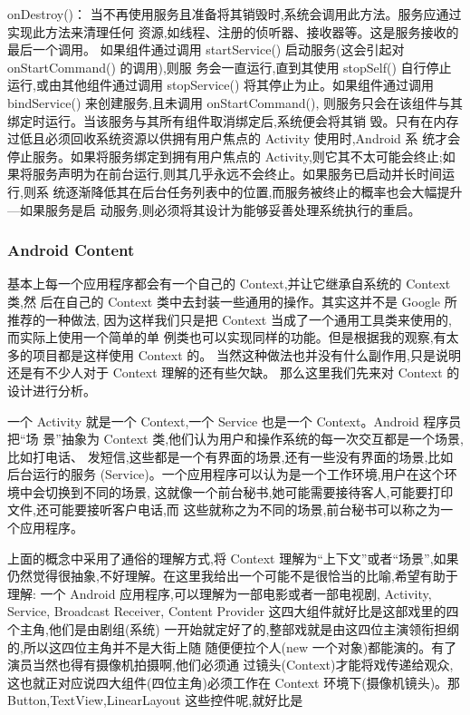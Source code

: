 \documentclass[UTF8]{ctexart}
\begin{document}
onDestroy()：
当不再使用服务且准备将其销毁时,系统会调用此方法。服务应通过实现此方法来清理任何
资源,如线程、注册的侦听器、接收器等。这是服务接收的最后一个调用。
如果组件通过调用 startService() 启动服务(这会引起对 onStartCommand() 的调用),则服
务会一直运行,直到其使用 stopSelf() 自行停止运行,或由其他组件通过调用 stopService()
将其停止为止。如果组件通过调用 bindService() 来创建服务,且未调用 onStartCommand(),
则服务只会在该组件与其绑定时运行。当该服务与其所有组件取消绑定后,系统便会将其销
毁。只有在内存过低且必须回收系统资源以供拥有用户焦点的 Activity 使用时,Android 系
统才会停止服务。如果将服务绑定到拥有用户焦点的 Activity,则它其不太可能会终止;如
果将服务声明为在前台运行,则其几乎永远不会终止。如果服务已启动并长时间运行,则系
统逐渐降低其在后台任务列表中的位置,而服务被终止的概率也会大幅提升—如果服务是启
动服务,则必须将其设计为能够妥善处理系统执行的重启。
\subsubsection{Android Content}
基本上每一个应用程序都会有一个自己的 Context,并让它继承自系统的 Context 类,然
后在自己的 Context 类中去封装一些通用的操作。其实这并不是 Google 所推荐的一种做法,
因为这样我们只是把 Context 当成了一个通用工具类来使用的,而实际上使用一个简单的单
例类也可以实现同样的功能。但是根据我的观察,有太多的项目都是这样使用 Context 的。
当然这种做法也并没有什么副作用,只是说明还是有不少人对于 Context 理解的还有些欠缺。
那么这里我们先来对 Context 的设计进行分析。
\par
一个 Activity 就是一个 Context,一个 Service 也是一个 Context。Android 程序员把“场
景”抽象为 Context 类,他们认为用户和操作系统的每一次交互都是一个场景,比如打电话、
发短信,这些都是一个有界面的场景,还有一些没有界面的场景,比如后台运行的服务
(Service)。一个应用程序可以认为是一个工作环境,用户在这个环境中会切换到不同的场景,
这就像一个前台秘书,她可能需要接待客人,可能要打印文件,还可能要接听客户电话,而
这些就称之为不同的场景,前台秘书可以称之为一个应用程序。
\par
上面的概念中采用了通俗的理解方式,将 Context 理解为“上下文”或者“场景”,如果
仍然觉得很抽象,不好理解。在这里我给出一个可能不是很恰当的比喻,希望有助于理解:
一个 Android 应用程序,可以理解为一部电影或者一部电视剧, Activity, Service, Broadcast
Receiver, Content Provider 这四大组件就好比是这部戏里的四个主角,他们是由剧组(系统)
一开始就定好了的,整部戏就是由这四位主演领衔担纲的,所以这四位主角并不是大街上随
随便便拉个人(new 一个对象)都能演的。有了演员当然也得有摄像机拍摄啊,他们必须通
过镜头(Context)才能将戏传递给观众,这也就正对应说四大组件(四位主角)必须工作在
Context 环境下(摄像机镜头)。那 Button,TextView,LinearLayout 这些控件呢,就好比是
\end{document}
